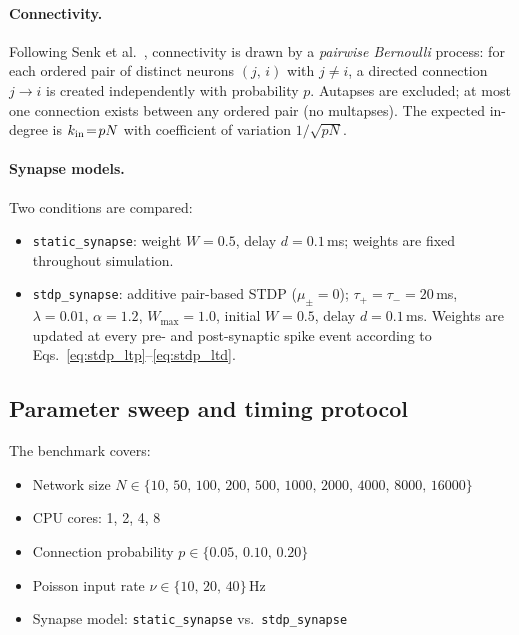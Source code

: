 \documentclass[10pt,twocolumn]{article}
\begin{document}
\paragraph{Connectivity.}
Following Senk et al.\ \cite{senk2022}, connectivity is drawn by
a \emph{pairwise Bernoulli} process: for each ordered pair of
distinct neurons $(j,\,i)$ with $j \ne i$, a directed connection
$j\!\to\!i$ is created independently with probability $p$.
Autapses are excluded; at most one connection exists between any
ordered pair (no multapses).
The expected in-degree is $k_{\rm in}\!=\!pN$ with coefficient of
variation $1/\sqrt{pN}$.

\paragraph{Synapse models.}
Two conditions are compared:
\begin{itemize}\setlength\itemsep{2pt}
  \item \texttt{static\_synapse}: weight $W\!=\!0.5$, delay
        $d\!=\!0.1$\,ms; weights are fixed throughout simulation.
  \item \texttt{stdp\_synapse}: additive pair-based STDP
        ($\mu_{\pm}\!=\!0$); $\tau_+\!=\!\tau_-\!=\!20$\,ms,
        $\lambda\!=\!0.01$, $\alpha\!=\!1.2$,
        $W_{\max}\!=\!1.0$, initial $W\!=\!0.5$,
        delay $d\!=\!0.1$\,ms.
        Weights are updated at every pre- and post-synaptic spike
        event according to Eqs.~\ref{eq:stdp_ltp}--\ref{eq:stdp_ltd}.
\end{itemize}

\subsection{Parameter sweep and timing protocol}

The benchmark covers:
\begin{itemize}\setlength\itemsep{0pt}
  \item Network size $N\in\{10,\,50,\,100,\,200,\,500,\,1000,\,2000,
        \,4000,\,8000,\,16000\}$
  \item CPU cores: 1, 2, 4, 8
  \item Connection probability $p\in\{0.05,\,0.10,\,0.20\}$
  \item Poisson input rate $\nu\in\{10,\,20,\,40\}$\,Hz
  \item Synapse model: \texttt{static\_synapse} vs.\
        \texttt{stdp\_synapse}
\end{itemize}
\end{document}
